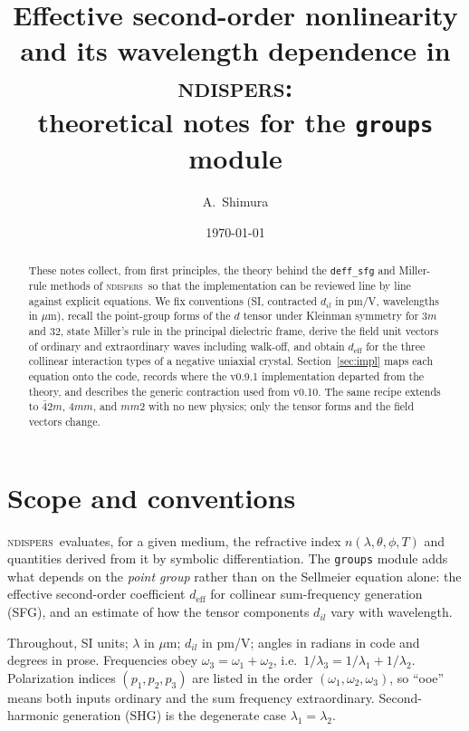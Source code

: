\documentclass[aps,pra,preprint,amsmath,amssymb,nofootinbib,superscriptaddress]{revtex4-2}
\newcommand{\ueff}{d_{\mathrm{eff}}}
\newcommand{\ndispers}{\textsc{ndispers}}
\begin{document}
\title{Effective second-order nonlinearity and its wavelength dependence in \ndispers:\\
theoretical notes for the \texttt{groups} module}

\author{A.~Shimura}
\date{\today}

\begin{abstract}
These notes collect, from first principles, the theory behind the
\texttt{deff\_sfg} and Miller-rule methods of \ndispers\ so that the
implementation can be reviewed line by line against explicit equations.
We fix conventions (SI, contracted $d_{il}$ in pm/V, wavelengths in
$\mu$m), recall the point-group forms of the $d$ tensor under Kleinman
symmetry for $3m$ and $32$, state Miller's rule in the principal dielectric
frame, derive the field unit vectors of ordinary and extraordinary waves
including walk-off, and obtain $\ueff$ for the three collinear interaction
types of a negative uniaxial crystal. Section~\ref{sec:impl} maps each
equation onto the code, records where the v0.9.1 implementation departed
from the theory, and describes the generic contraction used from v0.10. The same recipe extends to $\bar{4}2m$, $4mm$,
and $mm2$ with no new physics; only the tensor forms and the field
vectors change.
\end{abstract}

\maketitle

\section{Scope and conventions}

\ndispers\ evaluates, for a given medium, the refractive index
$n(\lambda,\theta,\phi,T)$ and quantities derived from it by symbolic
differentiation. The \texttt{groups} module adds what depends on the
\emph{point group} rather than on the Sellmeier equation alone: the
effective second-order coefficient $\ueff$ for collinear sum-frequency
generation (SFG), and an estimate of how the tensor components
$d_{il}$ vary with wavelength.

Throughout, SI units; $\lambda$ in $\mu$m; $d_{il}$ in pm/V; angles in
radians in code and degrees in prose. Frequencies obey
$\omega_3=\omega_1+\omega_2$, i.e.\ $1/\lambda_3 = 1/\lambda_1 + 1/\lambda_2$.
Polarization indices $(p_1,p_2,p_3)$ are listed in the order
$(\omega_1,\omega_2,\omega_3)$, so ``ooe'' means both inputs ordinary and
the sum frequency extraordinary. Second-harmonic generation (SHG) is the
degenerate case $\lambda_1=\lambda_2$.
\end{document}
